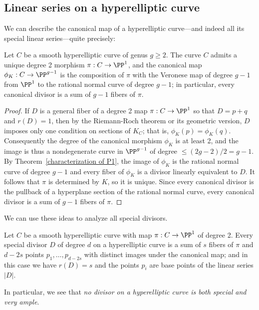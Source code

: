 \subsection{Linear series on a hyperelliptic curve}
We can describe the canonical map of a hyperelliptic curve---and indeed all its special linear series---quite precisely:

\begin{corollary}\label{canonical on hyperelliptic}
Let $C$ be a smooth hyperelliptic curve of genus $g\geq 2$. The curve $C$ admits a unique degree 2 morphism $\pi: C\to \PP^1$,
and the canonical map $\phi_K: C\to \PP^{g-1}$ is the composition of $\pi$ with the Veronese map of degree $g-1$ from
$\PP^1$ to the rational normal curve of degree $g-1$; in particular, every canonical divisor is a sum of $g-1$ fibers of $\pi$.
\end{corollary}

\begin{proof}
If $D$ is a general fiber of a degree 2 map $\pi:C\to \PP^1$ so that $D= p+q$ and $r(D) = 1$, then by the Riemann-Roch theorem or its geometric version, $D$ imposes only one condition on sections of $K_C$; that is, $\phi_K(p) = \phi_K(q)$. Consequently the degree of the canonical morphism $\phi_K$ is at least 2, and the image is thus a nondegenerate curve in $\PP^{g-1}$ of degree $\leq (2g-2)/2 = g-1$. By Theorem~\ref{characterization of P1}, the image of $\phi_K$ is the rational normal curve of degree $g-1$ and every fiber of $\phi_K$ is a divisor linearly equivalent to $D$. It follows that $\pi$ is determined by $K$, so it is unique. Since every canonical divisor is the pullback of a hyperplane section of the rational normal curve,
every canonical divisor is a sum of $g-1$ fibers of $\pi$.
\end{proof}

We can use these ideas to analyze all special divisors.

\begin{corollary}\label{special on hyperelliptic} Let $C$ be a smooth hyperelliptic curve with map $\pi: C\to \PP^1$ of degree 2.
Every special divisor $D$ of degree $d$ on a hyperelliptic curve is a sum of $s$ fibers of $\pi$ and $d-2s$ points $p_1,\dots,p_{d-2s}$ with distinct images under the canonical map; and in this case we have $r(D) = s$ and the points $p_i$ are base points of the linear series $|D|$.
\end{corollary}

In particular, we see that \emph{no divisor on a hyperelliptic curve is both special and very ample}.

